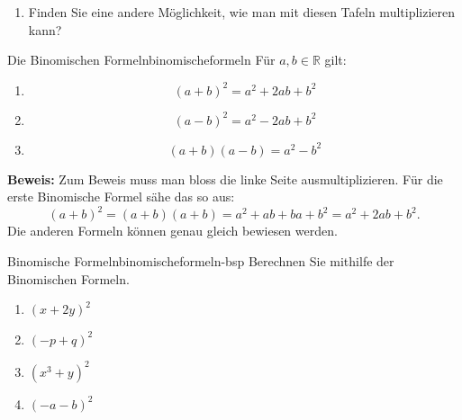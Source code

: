 \begin{LA}
\begin{enumerate}
\begin{enumerate}
\begin{center}
                        \end{center}

                  \item Finden Sie eine andere Möglichkeit, wie man mit diesen Tafeln multiplizieren kann?
              \end{enumerate}
    \end{enumerate}
\end{LA}






\clearpage
\begin{satz}{Die Binomischen Formeln}{binomischeformeln}
    Für \(a,b\in\mathbb{R}\) gilt:
    \begin{enumerate}
        \item
              \[
                  (a+b)^2=a^2+2ab+b^2
              \]

        \item
              \[
                  (a-b)^2=a^2-2ab+b^2
              \]

        \item
              \[
                  (a+b)(a-b)=a^2-b^2
              \]
    \end{enumerate}
\end{satz}

\textbf{Beweis:}
Zum Beweis muss man bloss die linke Seite ausmultiplizieren. Für die erste Binomische Formel sähe das so aus:
\[
    (a+b)^2
    =(a+b)(a+b)
    =a^2+ab+ba+b^2
    =a^2+2ab+b^2.
\]
Die anderen Formeln können genau gleich bewiesen werden.

\begin{bsp}{Binomische Formeln}{binomischeformeln-bsp}
    Berechnen Sie mithilfe der Binomischen Formeln.
    \begin{enumerate}
        \item \((x+2y)^2\)
              \vspace*{2cm}
        \item \((-p+q)^2\)
              \vspace*{2cm}
        \item \((x^3+y)^2\)
              \vspace*{2cm}
        \item \((-a-b)^2\)
              \vspace*{2cm}
    \end{enumerate}
\end{bsp}


